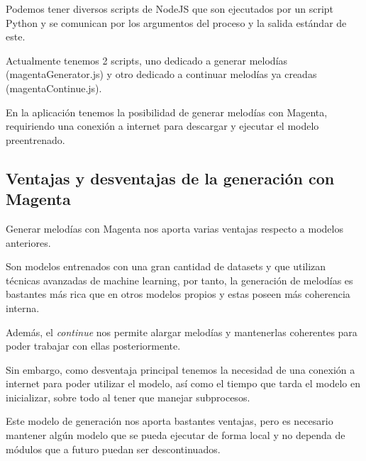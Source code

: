     Podemos tener diversos scripts de NodeJS que son ejecutados por un script Python y se comunican por los argumentos del proceso y la salida estándar de este. 

    Actualmente tenemos 2 scripts, uno dedicado a generar melodías (magentaGenerator.js) y otro dedicado a continuar melodías ya creadas (magentaContinue.js).

    En la aplicación tenemos la posibilidad de generar melodías con Magenta, requiriendo una conexión a internet para descargar y ejecutar el modelo preentrenado.

    \subsection{Ventajas y desventajas de la generación con Magenta}
    \label{ventajasYDesventajasMagenta}
    Generar melodías con Magenta nos aporta varias ventajas respecto a modelos anteriores.

    Son modelos entrenados con una gran cantidad de datasets y que utilizan técnicas avanzadas de machine learning, por tanto, la generación de melodías es bastantes más rica que en otros modelos propios y estas poseen más coherencia interna.

    Además, el \textit{continue} nos permite alargar melodías y mantenerlas coherentes para poder trabajar con ellas posteriormente.

    Sin embargo, como desventaja principal tenemos la necesidad de una conexión a internet para poder utilizar el modelo, así como el tiempo que tarda el modelo en inicializar, sobre todo al tener que manejar subprocesos.

    Este modelo de generación nos aporta bastantes ventajas, pero es necesario mantener algún modelo que se pueda ejecutar de forma local y no dependa de módulos que a futuro puedan ser descontinuados.